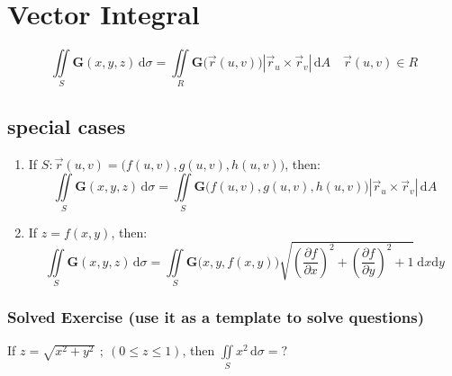 \documentclass[12pt, fleqn]{book}
\newcommand{\D}{\mathrm{d}}
\newcommand{\iis}{\iint\limits_S}
\newcommand{\rutrv}{\vec{r}_u \times \vec{r}_v\right}
\newcommand{\G}{\mathbf{G}}
\newcommand{\xy}{(x, y)}
\newcommand{\xyz}{(x, y, z)}
\newcommand{\uv}{(u, v)}
\newcommand{\rond}[2]{\frac{\partial #1}{\partial #2}}
\begin{document}
	\section{Vector Integral}
		\begin{equation}
			\iis \G\xyz \, \D \sigma 
			= \iint\limits_R \G\big(\vec{r}\uv\big) 
			\left|\rutrv| 
			\, \D A 
			\quad \vec{r}\uv \in R
		\end{equation}
		\subsection{special cases}
			\begin{enumerate}
				\item If $S: \vec{r}\uv = \big(f\uv, g\uv, h\uv\big)$, then:
				\begin{equation}
					\iis \G\xyz \, \D \sigma
					= \iis \G\big(f\uv, g\uv, h\uv\big) 
					\left|\rutrv| 
					\, \D A
				\end{equation}
				\item If $z = f\xy$, then:
				\begin{equation}
					\iis \G\xyz \, \D \sigma
					= \iis \G\big(x, y, f\xy\big)
					\sqrt{
						(\rond{f}{x})^2 + 
						(\rond{f}{y})^2 + 
						1
					} 
					\ \D x \D y
				\end{equation}				
			\end{enumerate}
		\subsubsection{Solved Exercise (use it as a template to solve questions)}
		If $z = \sqrt{x^2 + y^2} \ \, ; \ (0 \le z \le 1)$, then $\iis x^2 \, \D \sigma = ?$
\end{document}
